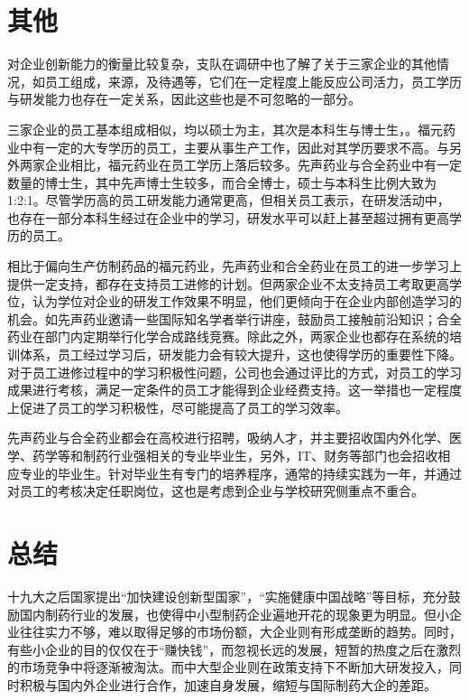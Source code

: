\documentclass[twocolumn,openany]{ctexbook}
\begin{document}
			\section{其他}
			对企业创新能力的衡量比较复杂，支队在调研中也了解了关于三家企业的其他情况，如员工组成，来源，及待遇等，它们在一定程度上能反应公司活力，员工学历与研发能力也存在一定关系，因此这些也是不可忽略的一部分。
			
			三家企业的员工基本组成相似，均以硕士为主，其次是本科生与博士生，。福元药业中有一定的大专学历的员工，主要从事生产工作，因此对其学历要求不高。与另外两家企业相比，福元药业在员工学历上落后较多。先声药业与合全药业中有一定数量的博士生，其中先声博士生较多，而合全博士，硕士与本科生比例大致为1:2:1。尽管学历高的员工研发能力通常更高，但相关员工表示，在研发活动中，也存在一部分本科生经过在企业中的学习，研发水平可以赶上甚至超过拥有更高学历的员工。
			
			相比于偏向生产仿制药品的福元药业，先声药业和合全药业在员工的进一步学习上提供一定支持，都存在支持员工进修的计划。但两家企业不太支持员工考取更高学位，认为学位对企业的研发工作效果不明显，他们更倾向于在企业内部创造学习的机会。如先声药业邀请一些国际知名学者举行讲座，鼓励员工接触前沿知识；合全药业在部门内定期举行化学合成路线竞赛。除此之外，两家企业也都存在系统的培训体系，员工经过学习后，研发能力会有较大提升，这也使得学历的重要性下降。对于员工进修过程中的学习积极性问题，公司也会通过评比的方式，对员工的学习成果进行考核，满足一定条件的员工才能得到企业经费支持。这一举措也一定程度上促进了员工的学习积极性，尽可能提高了员工的学习效率。
			
			先声药业与合全药业都会在高校进行招聘，吸纳人才，并主要招收国内外化学、医学、药学等和制药行业强相关的专业毕业生，另外，IT、财务等部门也会招收相应专业的毕业生。针对毕业生有专门的培养程序，通常的持续实践为一年，并通过对员工的考核决定任职岗位，这也是考虑到企业与学校研究侧重点不重合。
			
	
	
\section{总结}
	十九大之后国家提出“加快建设创新型国家”，“实施健康中国战略”等目标，充分鼓励国内制药行业的发展\citep{RN38}，也使得中小型制药企业遍地开花的现象更为明显。但小企业往往实力不够，难以取得足够的市场份额，大企业则有形成垄断的趋势。同时，有些小企业的目的仅仅在于“赚快钱”，而忽视长远的发展，短暂的热度之后在激烈的市场竞争中将逐渐被淘汰。而中大型企业则在政策支持下不断加大研发投入，同时积极与国内外企业进行合作，加速自身发展，缩短与国际制药大企的差距。
	
\end{document}
